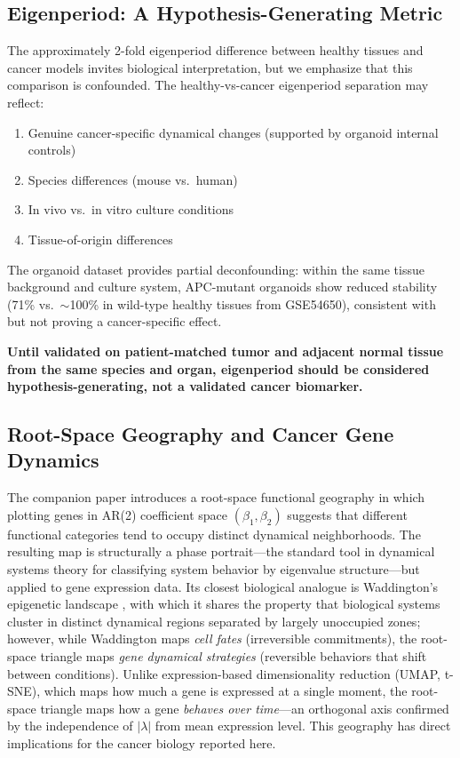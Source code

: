 \documentclass[11pt,letterpaper]{article}
\begin{document}
\subsection{Eigenperiod: A Hypothesis-Generating Metric}

The approximately 2-fold eigenperiod difference between healthy tissues and cancer models invites biological interpretation, but we emphasize that this comparison is confounded. The healthy-vs-cancer eigenperiod separation may reflect:

\begin{enumerate}[noitemsep]
    \item Genuine cancer-specific dynamical changes (supported by organoid internal controls)
    \item Species differences (mouse vs.\ human)
    \item In vivo vs.\ in vitro culture conditions
    \item Tissue-of-origin differences
\end{enumerate}

The organoid dataset provides partial deconfounding: within the same tissue background and culture system, APC-mutant organoids show reduced stability (71\% vs.\ $\sim$100\% in wild-type healthy tissues from GSE54650), consistent with but not proving a cancer-specific effect.

\textbf{Until validated on patient-matched tumor and adjacent normal tissue from the same species and organ, eigenperiod should be considered hypothesis-generating, not a validated cancer biomarker.}

\subsection{Root-Space Geography and Cancer Gene Dynamics}

The companion paper \citep{whiteside2026paper1} introduces a root-space functional geography in which plotting genes in AR(2) coefficient space $(\beta_1, \beta_2)$ suggests that different functional categories tend to occupy distinct dynamical neighborhoods. The resulting map is structurally a phase portrait---the standard tool in dynamical systems theory for classifying system behavior by eigenvalue structure---but applied to gene expression data. Its closest biological analogue is Waddington's epigenetic landscape \citep{waddington1957}, with which it shares the property that biological systems cluster in distinct dynamical regions separated by largely unoccupied zones; however, while Waddington maps \textit{cell fates} (irreversible commitments), the root-space triangle maps \textit{gene dynamical strategies} (reversible behaviors that shift between conditions). Unlike expression-based dimensionality reduction (UMAP, t-SNE), which maps how much a gene is expressed at a single moment, the root-space triangle maps how a gene \textit{behaves over time}---an orthogonal axis confirmed by the independence of $|\lambda|$ from mean expression level. This geography has direct implications for the cancer biology reported here.
\end{document}

